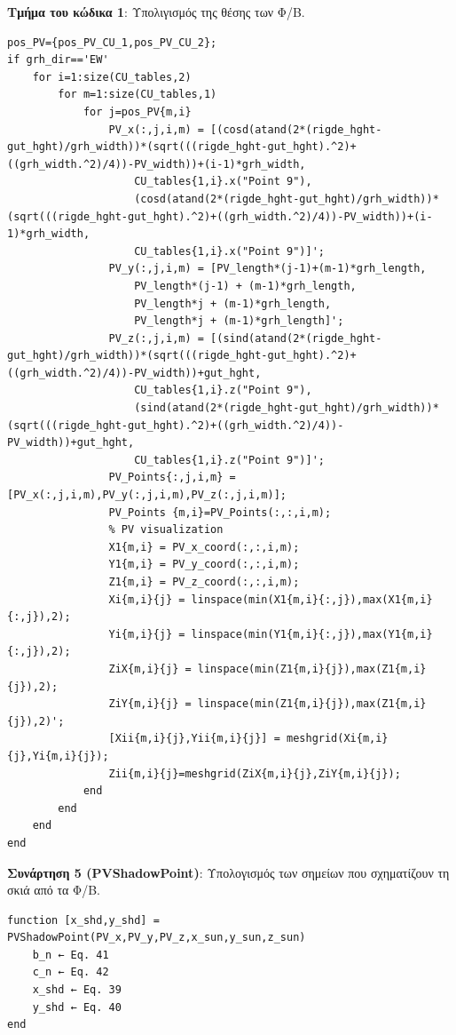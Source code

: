 \documentclass[12pt, a4paper]{report} %
\newcommand{\english}{\foreignlanguage{english}}
\begin{document}
\noindent \textbf{Τμήμα του κώδικα 1}: Υπολιγισμός της θέσης των Φ/Β.
\begin{lstlisting}
pos_PV={pos_PV_CU_1,pos_PV_CU_2};
if grh_dir=='EW'
    for i=1:size(CU_tables,2)
        for m=1:size(CU_tables,1)
            for j=pos_PV{m,i}
                PV_x(:,j,i,m) = [(cosd(atand(2*(rigde_hght-gut_hght)/grh_width))*(sqrt(((rigde_hght-gut_hght).^2)+((grh_width.^2)/4))-PV_width))+(i-1)*grh_width,
                    CU_tables{1,i}.x("Point 9"),
                    (cosd(atand(2*(rigde_hght-gut_hght)/grh_width))*(sqrt(((rigde_hght-gut_hght).^2)+((grh_width.^2)/4))-PV_width))+(i-1)*grh_width,
                    CU_tables{1,i}.x("Point 9")]';
                PV_y(:,j,i,m) = [PV_length*(j-1)+(m-1)*grh_length,
                    PV_length*(j-1) + (m-1)*grh_length,
                    PV_length*j + (m-1)*grh_length,
                    PV_length*j + (m-1)*grh_length]';
                PV_z(:,j,i,m) = [(sind(atand(2*(rigde_hght-gut_hght)/grh_width))*(sqrt(((rigde_hght-gut_hght).^2)+((grh_width.^2)/4))-PV_width))+gut_hght,
                    CU_tables{1,i}.z("Point 9"),
                    (sind(atand(2*(rigde_hght-gut_hght)/grh_width))*(sqrt(((rigde_hght-gut_hght).^2)+((grh_width.^2)/4))-PV_width))+gut_hght,
                    CU_tables{1,i}.z("Point 9")]';
                PV_Points{:,j,i,m} = [PV_x(:,j,i,m),PV_y(:,j,i,m),PV_z(:,j,i,m)];
                PV_Points {m,i}=PV_Points(:,:,i,m);
                % PV visualization
                X1{m,i} = PV_x_coord(:,:,i,m);
                Y1{m,i} = PV_y_coord(:,:,i,m);
                Z1{m,i} = PV_z_coord(:,:,i,m);
                Xi{m,i}{j} = linspace(min(X1{m,i}{:,j}),max(X1{m,i}{:,j}),2);
                Yi{m,i}{j} = linspace(min(Y1{m,i}{:,j}),max(Y1{m,i}{:,j}),2);
                ZiX{m,i}{j} = linspace(min(Z1{m,i}{j}),max(Z1{m,i}{j}),2);
                ZiY{m,i}{j} = linspace(min(Z1{m,i}{j}),max(Z1{m,i}{j}),2)';
                [Xii{m,i}{j},Yii{m,i}{j}] = meshgrid(Xi{m,i}{j},Yi{m,i}{j});
                Zii{m,i}{j}=meshgrid(ZiX{m,i}{j},ZiY{m,i}{j});
            end
        end
    end
end
\end{lstlisting}

\noindent \textbf{Συνάρτηση 5 (\english{PVShadowPoint})}: Υπολογισμός των σημείων που σχηματίζουν τη σκιά από τα Φ/Β.
\begin{lstlisting}
function [x_shd,y_shd] = PVShadowPoint(PV_x,PV_y,PV_z,x_sun,y_sun,z_sun)
    b_n ← Eq. 41
    c_n ← Eq. 42
    x_shd ← Eq. 39
    y_shd ← Eq. 40
end
\end{lstlisting}
\end{document}
